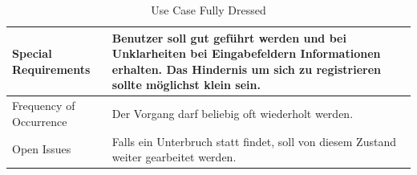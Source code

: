 \begin{table}[H]
\begin{tabular}{ | p{4cm} | p{10cm}  | }
	Special Requirements & Benutzer soll gut geführt werden und bei Unklarheiten bei
Eingabefeldern Informationen erhalten.
Das Hindernis um sich zu registrieren sollte möglichst klein sein. \\ \hline
	Frequency of Occurrence & Der Vorgang darf beliebig oft wiederholt werden. \\ \hline
	Open Issues & Falls ein Unterbruch statt findet, soll von diesem Zustand weiter gearbeitet werden. \\ \hline
    \end{tabular}
    \caption[Use Case Fully Dressed]{Use Case Fully Dressed}
\end{table}


